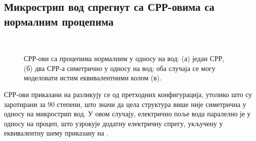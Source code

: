 \subsection{\label{sec:ML2SPerp} 
Микрострип вод спрегнут са СРР-овима са нормалним процепима}
\begin{figure}[!t]
\centering
{}\hfil
{}\\
\caption{СРР-ови са процепима нормалним у односу на вод: (а) један СРР,
(б) два СРР-а симетрично у односу на вод; оба случаја се могу моделовати истим еквивалентними колом (в).} 
\label{f7}
\end{figure}
СРР-ови приказани на  разликују се од претходних конфигурација, утолико што су заротирани за 90 степени, што значи да цела структура више није симетрична у односу на микрострип вод. У овом случају, електрично поље вода паралелно је у односу на процеп, што узрокује додатну електричну спрегу, укључену у еквивалентну шему приказану на .

